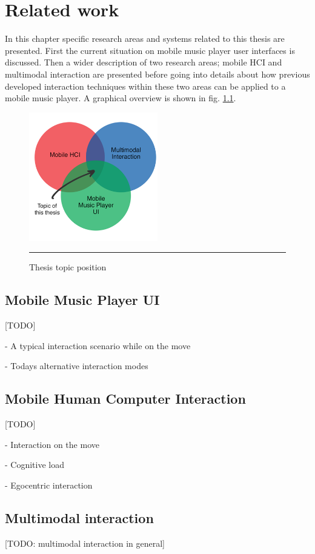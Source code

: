 \chapter{Related work}
In this chapter specific research areas and systems related to this thesis are presented. First the current situation on mobile music player user interfaces is discussed. Then a wider description of two research areas; mobile HCI and multimodal interaction are presented before going into details about how previous developed interaction techniques within these two areas can be applied to a mobile music player. A graphical overview is shown in fig. \ref{fig:venn}.

\begin{figure}[htbp]
	\centering
		\includegraphics[width=0.5\textwidth,height=\textheight,keepaspectratio]{./Figures/venn.png}
		\rule{35em}{0.5pt}
	\caption[Venn diagram]{Thesis topic position}
	\label{fig:venn}
\end{figure}


\section{Mobile Music Player UI}
[TODO]

- A typical interaction scenario while on the move

- Todays alternative interaction modes


\section{Mobile Human Computer Interaction}
[TODO]

- Interaction on the move

- Cognitive load

- Egocentric interaction


\section{Multimodal interaction}
[TODO: multimodal interaction in general]

